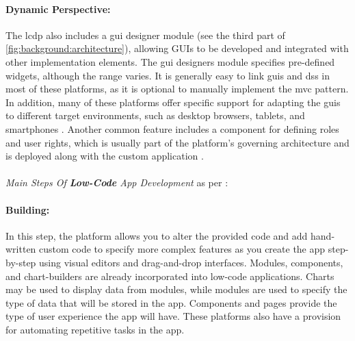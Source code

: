 \paragraph*{Dynamic Perspective:}
The \ac{lcdp} also includes a \ac{gui} designer module (see the third part of \ref{fig:background:architecture}), allowing GUIs to be developed and integrated with other implementation elements.
The \ac{gui} designers module specifies pre-defined widgets, although the range varies. 
It is generally easy to link \ac{gui}s and \ac{ds}s in most of these platforms, as it is optional to manually implement the \ac{mvc} pattern.
In addition, many of these platforms offer specific support for adapting the \ac{gui}s to different target environments, such as desktop browsers, tablets, and smartphones \cite{paper:lowcode:cabot}.
Another common feature includes a component for defining roles and user rights, which is usually part of the platform's governing architecture and is deployed along with the custom application \cite{article:nocode:sahina}.\\\\
\textit{Main Steps Of \textbf{Low-Code} App Development} as per \cite{misc:lowcode:steps}:

\paragraph{Building:}
In this step, the platform allows you to alter the provided code and add hand-written custom code to specify more complex features as you create the app step-by-step using visual editors and drag-and-drop interfaces.
Modules, components, and chart-builders are already incorporated into low-code applications. 
Charts may be used to display data from modules, while modules are used to specify the type of data that will be stored in the app. 
Components and pages provide the type of user experience the app will have.
These platforms also have a provision for automating repetitive tasks in the app.


